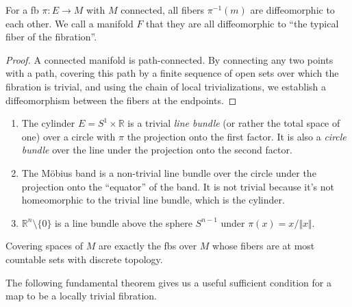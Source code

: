 \documentclass[english,letterpaper]{article}%
\numberwithin{equation}{section}
\numberwithin{figure}{section}
\numberwithin{table}{section}
\theoremstyle{definition}
\theoremstyle{definition}
\theoremstyle{definition}
\theoremstyle{plain}
\theoremstyle{plain}
\theoremstyle{plain}
\theoremstyle{plain}
\theoremstyle{remark}
\theoremstyle{remark}
\def\red{\color{red}}
\newcommand{\PRLsep}{   %
           \noindent\makebox[\linewidth]{
                \resizebox{0.5\linewidth}{1pt}{$\blacklozenge$}}}
\begin{document}
\begin{prop}
For a \gls{fb} $\pi:E\to M$ with $M$ connected, all fibers $\pi^{-1}(m)$ are diffeomorphic to each other. We call a manifold $F$ that they are all diffeomorphic to ``the typical fiber of the fibration''.
\end{prop}
\begin{proof}
A connected manifold is path-connected. By connecting any two points with a path, covering this path by a finite sequence of open sets over which the fibration is trivial, and using the chain of local trivializations, we establish a diffeomorphism between the fibers at the endpoints.
\end{proof}
\begin{example}
\begin{enumerate}
    \item The cylinder $E=S^1\times\mathbb{R}$ is a trivial \emph{line bundle} (or rather the total space of one) over a circle with $\pi$ the projection onto the first factor. It is also a \emph{circle bundle} over the line under the projection onto the second factor.
    \item The M\"obius band is a non-trivial line bundle over the circle under the projection onto the ``equator'' of the band. It is not trivial because it's not homeomorphic to the trivial line bundle, which is the cylinder.
    \item $\mathbb{R}^n\setminus\{0\}$ is a line bundle above the sphere $S^{n-1}$ under $\pi(x)=x/\Vert x\Vert$.
\end{enumerate}
\end{example}

\begin{example}
Covering spaces of $M$ are exactly the \glspl{fb} over $M$ whose fibers are at most countable sets with discrete topology.
\end{example}

The following fundamental theorem gives us a useful sufficient condition for a map to be a locally trivial fibration.
\end{document}
